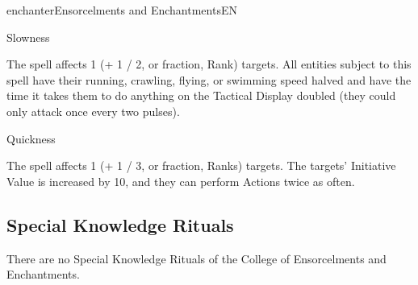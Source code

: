 \begin{college}[1.1]{enchanter}{Ensorcelments and Enchantments}{EN}
\begin{spell}[S-11]{Slowness}

\begin{effects}
The spell affects 1 (+ 1 / 2, or fraction, Rank) targets.  All
entities subject to this spell have their running, crawling, flying,
or swimming speed halved and have the time it takes them to do
anything on the Tactical Display doubled (\eg they could only attack
once every two pulses).
\end{effects}
\end{spell}

\begin{spell}[S-12]{Quickness}

\begin{effects}
The spell affects 1 (+ 1 / 3, or fraction, Ranks) targets.  The
targets' Initiative Value is increased by 10, and they can perform
Actions twice as often.
\end{effects}
\end{spell}

\subsection{Special Knowledge Rituals}

There are no Special Knowledge Rituals of the College of Ensorcelments
and Enchantments.
\end{college}
